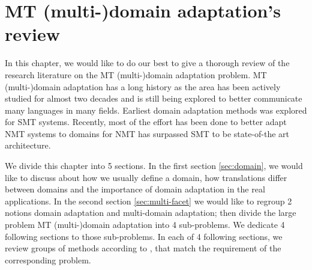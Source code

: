 \chapter{MT (multi-)domain adaptation's review}
In this chapter, we would like to do our best to give a thorough review of the research literature on the MT (multi-)domain adaptation problem. MT (multi-)domain adaptation has a long history as the area has been actively studied for almost two decades and is still being explored to better communicate many languages in many fields. Earliest domain adaptation methods was explored for SMT systems. Recently, most of the effort has been done to better adapt NMT systems to domains for NMT has surpassed SMT to be state-of-the art architecture.

We divide this chapter into 5 sections. In the first section \ref{sec:domain}, we would like to discuss about how we usually define a domain, how translations differ between domains and the importance of domain adaptation in the real applications. In the second section \ref{sec:multi-facet} we would like to regroup 2 notions domain adaptation and multi-domain adaptation; then divide the large problem MT (multi-)domain adaptation into 4 sub-problems. We dedicate 4 following sections to those sub-problems. In each of 4 following sections, we review groups of methods according to \citet{Chu18survey}, that match the requirement of the corresponding problem.

